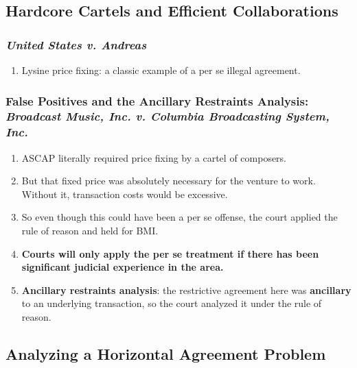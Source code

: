 \subsection{Hardcore Cartels and Efficient Collaborations}

\subsubsection{\emph{United States v. Andreas}}

\begin{enumerate}
    \item Lysine price fixing: a classic example of a per se illegal agreement.
\end{enumerate}

\subsubsection{False Positives and the Ancillary Restraints Analysis: 
\emph{Broadcast Music, Inc. v. Columbia Broadcasting System, Inc.}}

\begin{enumerate}
    \item ASCAP literally required price fixing by a cartel of composers.
    \item But that fixed price was absolutely necessary for the venture to work. 
    Without it, transaction costs would be excessive.
    \item So even though this could have been a per se offense, the court 
    applied the rule of reason and held for BMI.
    \item \textbf{Courts will only apply the per se treatment if there has been 
    significant judicial experience in the area.}
    \item \textbf{Ancillary restraints analysis}: the restrictive agreement here 
    was \textbf{ancillary} to an underlying transaction, so the court analyzed 
    it under the rule of reason.
\end{enumerate}

\subsection{Analyzing a Horizontal Agreement Problem}

